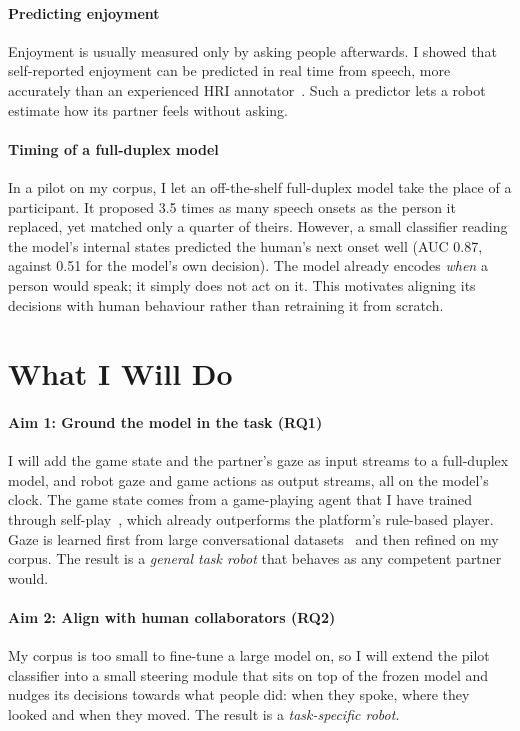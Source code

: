 \documentclass[sigconf,review,anonymous,nonacm]{acmart}
\begin{document}
\paragraph{Predicting enjoyment} Enjoyment is usually measured only by asking people afterwards. I showed that self-reported enjoyment can be predicted in real time from speech, more accurately than an experienced HRI annotator~\cite{anon2025joy}. Such a predictor lets a robot estimate how its partner feels without asking.

\paragraph{Timing of a full-duplex model} In a pilot on my corpus, I let an off-the-shelf full-duplex model take the place of a participant. It proposed 3.5 times as many speech onsets as the person it replaced, yet matched only a quarter of theirs. However, a small classifier reading the model's internal states predicted the human's next onset well (AUC 0.87, against 0.51 for the model's own decision). The model already encodes \emph{when} a person would speak; it simply does not act on it. This motivates aligning its decisions with human behaviour rather than retraining it from scratch.

\section{What I Will Do}

\paragraph{Aim 1: Ground the model in the task (RQ1)} I will add the game state and the partner's gaze as input streams to a full-duplex model, and robot gaze and game actions as output streams, all on the model's clock. The game state comes from a game-playing agent that I have trained through self-play~\cite{silver2018alphazero}, which already outperforms the platform's rule-based player. Gaze is learned first from large conversational datasets~\cite{agrawal2025seamless} and then refined on my corpus. The result is a \emph{general task robot} that behaves as any competent partner would.

\paragraph{Aim 2: Align with human collaborators (RQ2)} My corpus is too small to fine-tune a large model on, so I will extend the pilot classifier into a small steering module that sits on top of the frozen model and nudges its decisions towards what people did: when they spoke, where they looked and when they moved. The result is a \emph{task-specific robot}.
\end{document}
